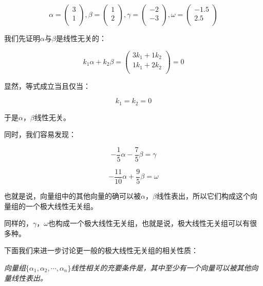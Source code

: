 \documentclass[a4paper]{ctexart}
\begin{document}
$$
\alpha=
\left(
  \begin{array}{cccc}
    3\\
    1\\
  \end{array}
\right)
,
\beta=
\left(
  \begin{array}{cccc}
    1\\
    2\\
  \end{array}
\right)
,
\gamma=
\left(
  \begin{array}{cccc}
    -2\\
    -3\\
  \end{array}
\right)
,
\omega=
\left(
  \begin{array}{cccc}
    -1.5\\
    2.5\\
  \end{array}
\right)
$$

我们先证明$\alpha$与$\beta$是线性无关的：

$$
k_1\alpha+k_2\beta
=
\left(
  \begin{array}{cccc}
    3k_1+1k_2\\
    1k_1+2k_2\\
  \end{array}
\right)
=
0
$$
  
显然，等式成立当且仅当：

$$
k_1=k_2=0
$$

于是$\alpha$，$\beta$线性无关。

同时，我们容易发现：

$$
-\frac{1}{5}\alpha-\frac{7}{5}\beta=\gamma
$$

$$
-\frac{11}{10}\alpha+\frac{9}{5}\beta=\omega
$$

也就是说，向量组中的其他向量的确可以被$\alpha$，$\beta$线性表出，所以它们构成这个向量组的一个极大线性无关组。

同样的，$\gamma$，$\omega$也构成一个极大线性无关组，也就是说，极大线性无关组可以有很多种。

下面我们来进一步讨论更一般的极大线性无关组的相关性质：

\textit{向量组$\{\alpha_1,\alpha_2,\cdots,\alpha_n\}$线性相关的充要条件是，其中至少有一个向量可以被其他向量线性表出。}
\end{document}
